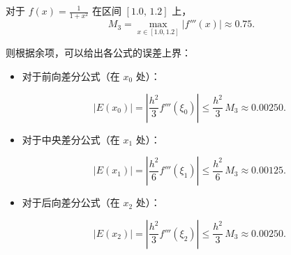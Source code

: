 \documentclass[11pt]{article}
\begin{document}
对于 \(f(x)=\frac{1}{1+x^2}\) 在区间 \([1.0,\,1.2]\) 上， \[
M_3 = \max_{x\in[1.0,1.2]} \lvert f'''(x)\rvert \approx 0.75.
\]

则根据余项，可以给出各公式的误差上界：

\begin{itemize}
\item
  对于前向差分公式（在 \(x_0\) 处）：

  \[
  \left\lvert E(x_0) \right\rvert = \left\lvert \frac{h^2}{3} f'''(\xi_0) \right\rvert \le \frac{h^2}{3}\, M_3 \approx 0.00250.
  \]
\item
  对于中央差分公式（在 \(x_1\) 处）：

  \[
  \left\lvert E(x_1) \right\rvert = \left\lvert \frac{h^2}{6} f'''(\xi_1) \right\rvert \le \frac{h^2}{6}\, M_3 \approx 0.00125.
  \]
\item
  对于后向差分公式（在 \(x_2\) 处）：

  \[
  \left\lvert E(x_2) \right\rvert = \left\lvert \frac{h^2}{3} f'''(\xi_2) \right\rvert \le \frac{h^2}{3}\, M_3 \approx 0.00250.
  \]
\end{itemize}
\end{document}
